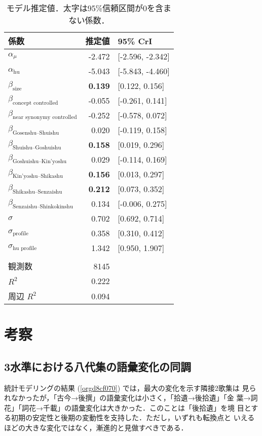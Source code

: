 \documentclass[submit]{ipsj}
\renewcommand{\ref}{\cref}
\begin{document}
\begin{table}[tb]
\caption{\label{tab:org3689362}モデル推定値．太字は95\%信頼区間が0を含まない係数．}
\centering
\begin{tabular}{lrl}
係数 & 推定値 & 95\% CrI\\
\hline
\(\alpha_{\mu}\) & -2.472 & {[}-2.596, -2.342]\\
\(\alpha_{\text{hu}}\) & -5.043 & {[}-5.843, -4.460]\\
\(\beta_{\text{size}}\) & \textbf{0.139} & {[}0.122, 0.156]\\
\(\beta_{\text{concept controlled}}\) & -0.055 & {[}-0.261, 0.141]\\
\(\beta_{\text{near synonymy controlled}}\) & -0.252 & {[}-0.578, 0.072]\\
\(\beta_{\text{Gosenshu--Shuishu}}\) & 0.020 & {[}-0.119, 0.158]\\
\(\beta_{\text{Shuishu--Goshuishu}}\) & \textbf{0.158} & {[}0.019, 0.296]\\
\(\beta_{\text{Goshuishu--Kin'yoshu}}\) & 0.029 & {[}-0.114, 0.169]\\
\(\beta_{\text{Kin'yoshu--Shikashu}}\) & \textbf{0.156} & {[}0.013, 0.297]\\
\(\beta_{\text{Shikashu--Senzaishu}}\) & \textbf{0.212} & {[}0.073, 0.352]\\
\(\beta_{\text{Senzaishu--Shinkokinshu}}\) & 0.134 & {[}-0.006, 0.275]\\
\(\sigma\) & 0.702 & {[}0.692, 0.714]\\
\(\sigma_{\text{profile}}\) & 0.358 & {[}0.310, 0.412]\\
\(\sigma_{\text{hu profile}}\) & 1.342 & {[}0.950, 1.907]\\
 &  & \\
観測数 & 8145 & \\
\(R^2\) & 0.222 & \\
周辺 \(R^2\) & 0.094 & \\
\end{tabular}
\end{table}
\section{考察\label{org9f97884}}
\label{sec:org744fede}
\subsection{3水準における八代集の語彙変化の同調\label{org82e639d}}
\label{sec:org1015779}
統計モデリングの結果 (\ref{orgd8cf070}) では，最大の変化を示す隣接2歌集は
見られなかったが，「古今→後撰」の語彙変化は小さく，「拾遺→後拾遺」「金
葉→詞花」「詞花→千載」の語彙変化は大きかった．このことは「後拾遺」を境
目とする初期の安定性と後期の変動性を支持した．ただし，いずれも転換点と
いえるほどの大きな変化ではなく，漸進的と見做すべきである．
\end{document}
